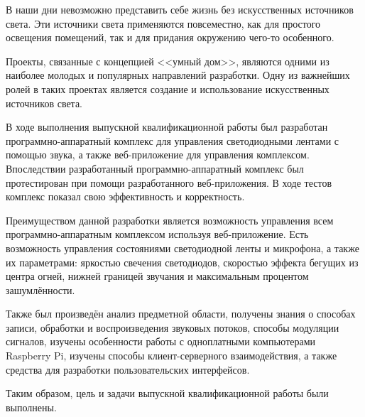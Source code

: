 \conclusion

В наши дни невозможно представить себе жизнь без искусственных источников света. Эти источники света применяются повсеместно, как для простого освещения помещений, так и для придания окружению чего-то особенного.

Проекты, связанные с концепцией <<умный дом>>, являются одними из наиболее молодых и популярных направлений разработки. Одну из важнейших ролей в таких проектах является создание и использование искусственных источников света.

В ходе выполнения выпускной квалификационной работы был разработан программно-аппаратный комплекс для управления светодиодными лентами с помощью звука, а также веб-приложение для управления комплексом. Впоследствии разработанный программно-аппаратный комплекс был протестирован при помощи разработанного веб-приложения. В ходе тестов комплекс показал свою эффективность и корректность.

Преимуществом данной разработки является возможность управления всем программно-аппаратным комплексом используя веб-приложение. Есть возможность управления состояниями светодиодной ленты и микрофона, а также их параметрами: яркостью свечения светодиодов, скоростью эффекта бегущих из центра огней, нижней границей звучания и максимальным процентом зашумлённости.

Также был произведён анализ предметной области, получены знания о способах записи, обработки и воспроизведения звуковых потоков, способы модуляции сигналов, изучены особенности работы с одноплатными компьютерами Raspberry Pi, изучены способы клиент-серверного взаимодействия, а также средства для разработки пользовательских интерфейсов. 

Таким образом, цель и задачи выпускной квалификационной работы были выполнены.

